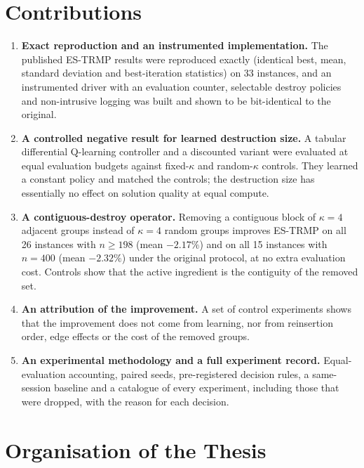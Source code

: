 
\section{Contributions}

\begin{enumerate}
\item \textbf{Exact reproduction and an instrumented implementation.} The published ES-TRMP results were reproduced exactly (identical best, mean, standard deviation and best-iteration statistics) on 33 instances, and an instrumented driver with an evaluation counter, selectable destroy policies and non-intrusive logging was built and shown to be bit-identical to the original.
\item \textbf{A controlled negative result for learned destruction size.} A tabular differential Q-learning controller and a discounted variant were evaluated at equal evaluation budgets against fixed-$\kappa$ and random-$\kappa$ controls. They learned a constant policy and matched the controls; the destruction size has essentially no effect on solution quality at equal compute.
\item \textbf{A contiguous-destroy operator.} Removing a contiguous block of $\kappa=4$ adjacent groups instead of $\kappa=4$ random groups improves ES-TRMP on all 26 instances with $n\ge198$ (mean $-2.17\%$) and on all 15 instances with $n=400$ (mean $-2.32\%$) under the original protocol, at no extra evaluation cost. Controls show that the active ingredient is the contiguity of the removed set.
\item \textbf{An attribution of the improvement.} A set of control experiments shows that the improvement does not come from learning, nor from reinsertion order, edge effects or the cost of the removed groups.
\item \textbf{An experimental methodology and a full experiment record.} Equal-evaluation accounting, paired seeds, pre-registered decision rules, a same-session baseline and a catalogue of every experiment, including those that were dropped, with the reason for each decision.
\end{enumerate}


\section{Organisation of the Thesis}

